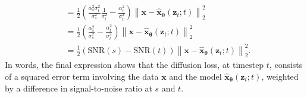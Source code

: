 \begin{align}
    \\[5pt] & = \frac{1}{2} \left(\frac{\alpha_s^2 \sigma^2_{t}}{\sigma_{s}^2}\frac{1}{\sigma_t^2} - \frac{\alpha^2_{t}}{\sigma_{t}^2} \right) \left\| \mathbf{x} - \hat{\mathbf{x}}_{\boldsymbol{\theta}}(\mathbf{z}_t;t) \right\|^2_2 
    \\[5pt] & = \frac{1}{2} \left(\frac{\alpha_s^2}{\sigma_{s}^2} - \frac{\alpha^2_{t}}{\sigma_{t}^2}\right)\left\| \mathbf{x} - \hat{\mathbf{x}}_{\boldsymbol{\theta}}(\mathbf{z}_t;t) \right\|^2_2 
    \\[5pt] & = \frac{1}{2} \left(\mathrm{SNR}(s) - \mathrm{SNR}(t)\right)\left\| \mathbf{x} - \hat{\mathbf{x}}_{\boldsymbol{\theta}}(\mathbf{z}_t;t) \right\|^2_2. \label{eq: kl_denoising}
\end{align}
%
In words, the final expression shows that the diffusion loss, at timestep $t$, consists of a squared error term involving the data $\mathbf{x}$ and the model $\hat{\mathbf{x}}_{\boldsymbol{\theta}}(\mathbf{z}_t;t)$, weighted by a difference in signal-to-noise ratio at $s$ and $t$.

%

